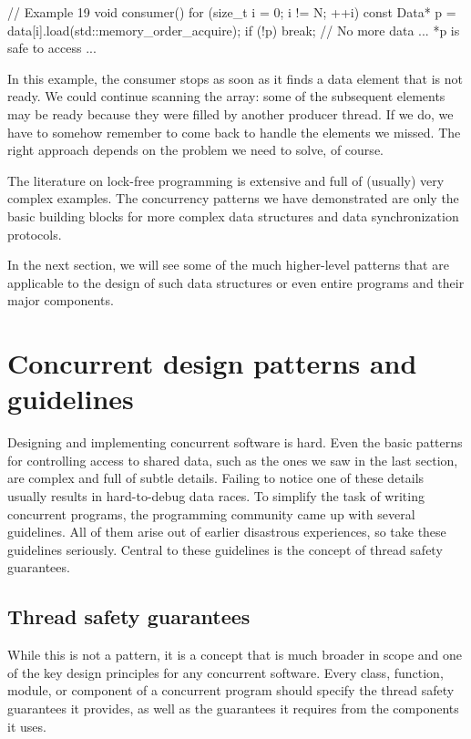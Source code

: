 \begin{code}
// Example 19
void consumer() {
  for (size_t i = 0; i != N; ++i) {
    const Data* p =
      data[i].load(std::memory_order_acquire);
    if (!p) break; // No more data
    ... *p is safe to access ...
  }
}
\end{code}

In this example, the consumer stops as soon as it finds a data element that is not ready. We could continue scanning the array: some of the subsequent elements may be ready because they were filled by another producer thread. If we do, we have to somehow remember to come back to handle the elements we missed. The right approach depends on the problem we need to solve, of course.

The literature on lock-free programming is extensive and full of (usually) very complex examples. The concurrency patterns we have demonstrated are only the basic building blocks for more complex data structures and data synchronization protocols.

In the next section, we will see some of the much higher-level patterns that are applicable to the design of such data structures or even entire programs and their major components.

\section{Concurrent design patterns and guidelines}

Designing and implementing concurrent software is hard. Even the basic patterns for controlling access to shared data, such as the ones we saw in the last section, are complex and full of subtle details. Failing to notice one of these details usually results in hard-to-debug data races. To simplify the task of writing concurrent programs, the programming community came up with several guidelines. All of them arise out of earlier disastrous experiences, so take these guidelines seriously. Central to these guidelines is the concept of thread safety guarantees.

\subsection{Thread safety guarantees}

While this is not a pattern, it is a concept that is much broader in scope and one of the key design principles for any concurrent software. Every class, function, module, or component of a concurrent program should specify the thread safety guarantees it provides, as well as the guarantees it requires from the components it uses.

